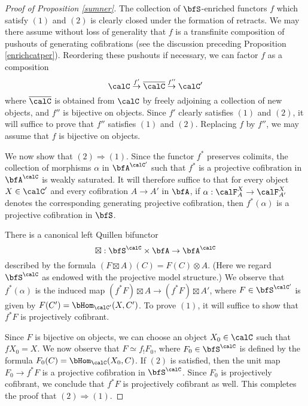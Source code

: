 \begin{Simplicial Categories}
\begin{proof}[Proof of Proposition \ref{sumner}]
The collection of $\bfS$-enriched functors $f$ which satisfy $(1)$ and $(2)$ is clearly
closed under the formation of retracts. We may there assume without loss of generality
that $f$ is a transfinite composition of pushouts of generating cofibrations
(see the discussion preceding Proposition \ref{enrichcatper}). Reordering
these pushouts if necessary, we can factor $f$ as a composition
$$ \calC \stackrel{f'}{\rightarrow} \overline{\calC} \stackrel{f''}{\rightarrow} \calC'$$
where $\overline{\calC}$ is obtained from $\calC$ by freely adjoining a collection of
new objects, and $f''$ is bijective on objects. Since $f'$ clearly satisfies
$(1)$ and $(2)$, it will suffice to prove that $f''$ satisfies $(1)$ and $(2)$.
Replacing $f$ by $f''$, we may assume that $f$ is bijective on objects.

We now show that $(2) \Rightarrow (1)$. Since the functor $f^{\ast}$ preserves colimits, the collection of morphisms $\alpha$ in $\bfA^{\calC'}$ such that $f^{\ast}$ is a projective cofibration in $\bfA^{\calC}$ is weakly saturated. It will therefore suffice to that for every object $X \in \calC'$ and every cofibration $A \rightarrow A'$ in $\bfA$, if $\alpha: \calF^{X}_{A} \rightarrow \calF^{X}_{A'}$ denotes the corresponding generating projective cofibration, then $f^{\ast}(\alpha)$ is a projective cofibration in $\bfS$.

There is a canonical left Quillen bifunctor
$$ \boxtimes: \bfS^{\calC} \times \bfA \rightarrow \bfA^{\calC}$$
described by the formula $(F \boxtimes A)(C) = F(C) \otimes A$.
(Here we regard $\bfS^{\calC}$ as endowed with the projective model structure.)
We observe that $f^{\ast}(\alpha)$ is the induced map
$(f^{\ast} F) \boxtimes A \rightarrow (f^{\ast} F) \boxtimes A'$, where
$F \in \bfS^{\calC'}$ is given by $F(C') = \bHom_{\calC'}( X, C')$. 
To prove $(1)$, it will suffice to show that $f^{\ast} F$ is projectively cofibrant.

Since $F$ is bijective on objects, we can choose an object $X_0 \in \calC$ such that
$fX_0 = X$. We now observe that $F \simeq f_{!} F_0$, where $F_0 \in \bfS^{\calC}$
is defined by the formula $F_0(C) = \bHom_{\calC}(X_0, C)$. If $(2)$ is satisfied, then
the unit map $F_0 \rightarrow f^{\ast} F$ is a projective cofibration in $\bfS^{\calC}$.
Since $F_0$ is projectively cofibrant, we conclude that $f^{\ast} F$ is projectively cofibrant as well.
This completes the proof that $(2) \Rightarrow (1)$.


\end{proof}
\end{Simplicial Categories}

